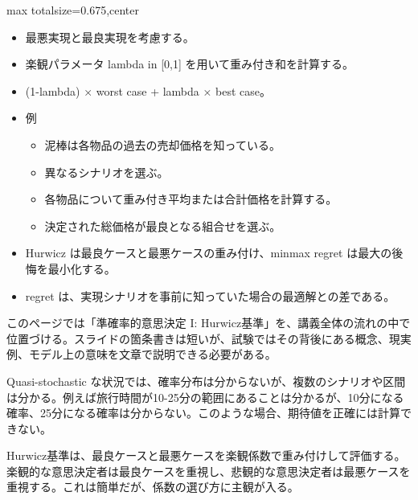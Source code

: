 \clearpage
{}
\begin{adjustbox}{max totalsize={\textwidth}{0.675\textheight},center}
\begin{minipage}{\textwidth}\scriptsize
\begin{minipage}[t]{0.485\textwidth}
\begin{itemize}
\item 最悪実現と最良実現を考慮する。
\item 楽観パラメータ lambda in [0,1] を用いて重み付き和を計算する。
\item (1-lambda) × worst case + lambda × best case。
\item 例
\begin{itemize}
\item 泥棒は各物品の過去の売却価格を知っている。
\item 異なるシナリオを選ぶ。
\item 各物品について重み付き平均または合計価格を計算する。
\item 決定された総価格が最良となる組合せを選ぶ。
\end{itemize}
\end{itemize}
\begin{itemize}
\item Hurwicz は最良ケースと最悪ケースの重み付け、minmax regret は最大の後悔を最小化する。
\item regret は、実現シナリオを事前に知っていた場合の最適解との差である。
\end{itemize}
\end{minipage}\hfill
\begin{minipage}[t]{0.485\textwidth}
このページでは「準確率的意思決定 I: Hurwicz基準」を、講義全体の流れの中で位置づける。スライドの箇条書きは短いが、試験ではその背後にある概念、現実例、モデル上の意味を文章で説明できる必要がある。\par
Quasi-stochastic な状況では、確率分布は分からないが、複数のシナリオや区間は分かる。例えば旅行時間が10-25分の範囲にあることは分かるが、10分になる確率、25分になる確率は分からない。このような場合、期待値を正確には計算できない。\par
Hurwicz基準は、最良ケースと最悪ケースを楽観係数で重み付けして評価する。楽観的な意思決定者は最良ケースを重視し、悲観的な意思決定者は最悪ケースを重視する。これは簡単だが、係数の選び方に主観が入る。\par

\end{minipage}
\end{minipage}
\end{adjustbox}
